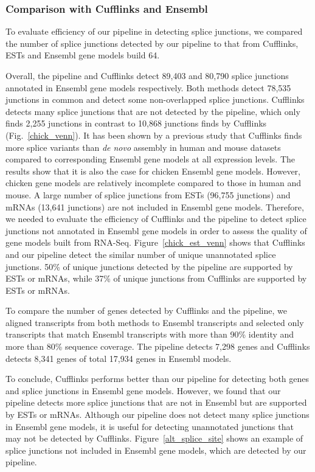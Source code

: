 \documentclass[10pt]{article}
\begin{document}
\subsubsection*{Comparison with Cufflinks and Ensembl}
To evaluate efficiency of our pipeline in detecting splice junctions,
we compared the number of splice junctions detected by our pipeline to that from Cufflinks\cite{Trapnell:2010kd}, ESTs and
Ensembl gene models build 64.

Overall, the pipeline and Cufflinks detect 89,403 and 80,790 splice junctions annotated in Ensembl gene models respectively.
Both methods detect 78,535 junctions in common and detect some non-overlapped splice junctions.
Cufflinks detects many splice junctions that are not detected by the pipeline, which only finds 2,255 junctions
in contrast to 10,868 junctions finds by Cufflinks (Fig.~\ref{chick_venn}).
It has been shown by a previous study that Cufflinks finds more splice variants than \emph{de novo} assembly
in human and mouse datasets compared to corresponding Ensembl gene models at all expression levels\cite{Schulz:2012je}.
The results show that it is also the case for chicken Ensembl gene models.
However, chicken gene models are relatively incomplete compared to those in human and mouse.
A large number of splice junctions from ESTs (96,755 junctions) and mRNAs (13,641 junctions) are not included in Ensembl gene models.
Therefore, we needed to evaluate the efficiency of Cufflinks and the pipeline to detect splice junctions not annotated in Ensembl gene models
in order to assess the quality of gene models built from RNA-Seq.
Figure~\ref{chick_est_venn} shows that Cufflinks and our pipeline detect the similar number of unique unannotated splice junctions.
50\% of unique junctions detected by the pipeline are supported by ESTs or mRNAs, while 37\% of unique junctions from Cufflinks are supported by ESTs or mRNAs.

To compare the number of genes detected by Cufflinks and the pipeline, we aligned transcripts from both methods to Ensembl transcripts and
selected only transcripts that match Ensembl transcripts with more than 90\% identity and more than 80\% sequence coverage.
The pipeline detects 7,298 genes and Cufflinks detects 8,341 genes of total 17,934 genes in Ensembl models.

To conclude, Cufflinks performs better than our pipeline for detecting both genes and splice junctions in Ensembl gene models.
However, we found that our pipeline detects more splice junctions that are not in Ensembl but are supported by ESTs or mRNAs.
Although our pipeline does not detect many splice junctions in Ensembl gene models, it is useful for detecting unannotated junctions that may not be detected by Cufflinks.
Figure~\ref{alt_splice_site} shows an example of splice junctions not included in Ensembl gene models, which are detected by our pipeline.
\end{document}
